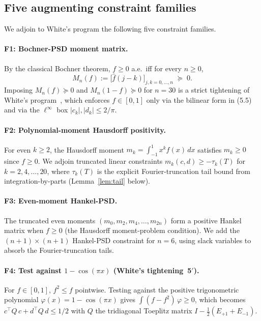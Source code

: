 \documentclass[11pt]{article}
\theoremstyle{plain}
\theoremstyle{definition}
\begin{document}
\subsection{Five augmenting constraint families}\label{sec:families}

We adjoin to White's program the following five constraint families.

\paragraph{F1: Bochner-PSD moment matrix.} By the classical Bochner
theorem, $f \ge 0$ a.e.\ iff for every $n \ge 0$,
\[
M_n(f) := \bigl[\hat f(j - k)\bigr]_{j,k = 0,\dots,n} \;\succeq\; 0.
\]
Imposing $M_n(f) \succeq 0$ and $M_n(1 - f) \succeq 0$ for $n = 30$ is
a strict tightening of White's program~\cite[\S5]{White2023}, which
enforces $f \in [0, 1]$ only via the bilinear form in (5.5) and via the
$\ell^\infty$ box $|c_k|, |d_k| \le 2/\pi$.

\paragraph{F2: Polynomial-moment Hausdorff positivity.} For
even $k \ge 2$, the Hausdorff moment $m_k = \int_{-1}^1 x^k f(x)\, dx$
satisfies $m_k \ge 0$ since $f \ge 0$. We adjoin truncated linear
constraints $m_k(c, d) \ge -\tau_k(T)$ for $k = 2, 4, \dots, 20$, where
$\tau_k(T)$ is the explicit Fourier-truncation tail bound from
integration-by-parts (Lemma~\ref{lem:tail} below).

\paragraph{F3: Even-moment Hankel-PSD.} The truncated even moments
$(m_0, m_2, m_4, \dots, m_{2n})$ form a positive Hankel matrix when
$f \ge 0$ (the Hausdorff moment-problem condition). We add the
$(n+1)\times(n+1)$ Hankel-PSD constraint for $n = 6$, using slack
variables to absorb the Fourier-truncation tails.

\paragraph{F4: Test against $1 - \cos(\pi x)$ (White's tightening~5$'$).}
For $f \in [0,1]$, $f^2 \le f$ pointwise. Testing against the
positive trigonometric polynomial $\varphi(x) = 1 - \cos(\pi x)$ gives
$\int (f - f^2)\, \varphi \ge 0$, which becomes
$c^\top Q\, c + d^\top Q\, d \le 1/2$ with $Q$ the tridiagonal Toeplitz
matrix $I - \tfrac12(E_{+1} + E_{-1})$.
\end{document}
